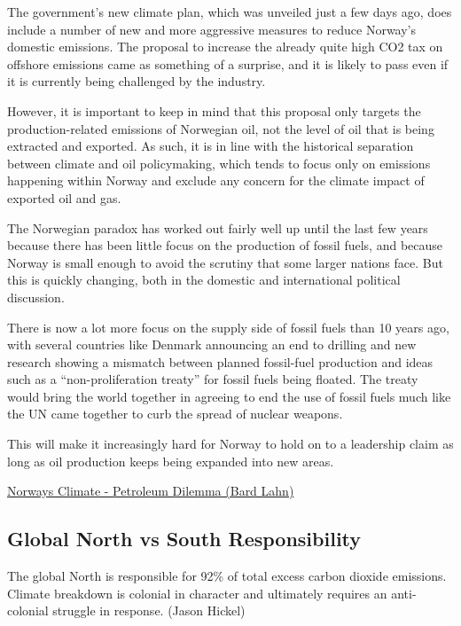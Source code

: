 \documentclass[
]{book}
\begin{document}
The government's new climate plan, which was unveiled just a few days ago, does include a number of new and more aggressive measures to reduce Norway's domestic emissions. The proposal to increase the already quite high CO2 tax on offshore emissions came as something of a surprise, and it is likely to pass even if it is currently being challenged by the industry.

However, it is important to keep in mind that this proposal only targets the production-related emissions of Norwegian oil, not the level of oil that is being extracted and exported. As such, it is in line with the historical separation between climate and oil policymaking, which tends to focus only on emissions happening within Norway and exclude any concern for the climate impact of exported oil and gas.

The Norwegian paradox has worked out fairly well up until the last few years because there has been little focus on the production of fossil fuels, and because Norway is small enough to avoid the scrutiny that some larger nations face. But this is quickly changing, both in the domestic and international political discussion.

There is now a lot more focus on the supply side of fossil fuels than 10 years ago, with several countries like Denmark announcing an end to drilling and new research showing a mismatch between planned fossil-fuel production and ideas such as a ``non-proliferation treaty'' for fossil fuels being floated. The treaty would bring the world together in agreeing to end the use of fossil fuels much like the UN came together to curb the spread of nuclear weapons.

This will make it increasingly hard for Norway to hold on to a leadership claim as long as oil production keeps being expanded into new areas.

\href{https://www.vox.com/22227063/norway-oil-gas-climate-change}{Norways Climate - Petroleum Dilemma (Bard Lahn)}

\hypertarget{global-north-vs-south-responsibility}{%
\subsection{Global North vs South Responsibility}\label{global-north-vs-south-responsibility}}

The global North is responsible for 92\% of total excess carbon dioxide emissions.
Climate breakdown is colonial in character and ultimately requires an anti-colonial struggle in response. (Jason Hickel)
\end{document}
